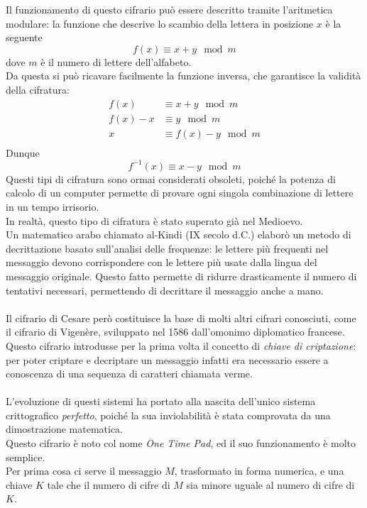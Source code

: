 \documentclass[italian,A4,12pt]{article}
\begin{document}
    Il funzionamento di questo cifrario può essere descritto tramite l'aritmetica modulare: la funzione che descrive lo scambio della lettera in posizione $x$ è la seguente
    $$f(x)\equiv x+y \mod{m}$$
    dove $m$ è il numero di lettere dell'alfabeto.\\
    Da questa si può ricavare facilmente la funzione inversa, che garantisce la validità della cifratura:
    \begin{align*}
      f(x) & \equiv x+y \mod{m}\\
      f(x)-x & \equiv y \mod{m}\\
      x & \equiv f(x)-y \mod{m}\\
    \end{align*}
    Dunque
    $$f^{-1}(x)\equiv x-y \mod{m}$$
    Questi tipi di cifratura sono ormai considerati obsoleti, poiché la potenza di calcolo di un computer permette di provare ogni singola combinazione di lettere in un tempo irrisorio.\\
    In realtà, questo tipo di cifratura è stato superato già nel Medioevo. \\ Un matematico arabo chiamato al-Kindi (IX secolo d.C.) elaborò un metodo di decrittazione basato sull'analisi delle frequenze: le lettere più frequenti nel messaggio devono corrispondere con le lettere più usate dalla lingua del messaggio originale. Questo fatto permette di ridurre drasticamente il numero di tentativi necessari, permettendo di decrittare il messaggio anche a mano.\\\\
    Il cifrario di Cesare però costituisce la base di molti altri cifrari conosciuti, come il cifrario di Vigenère, sviluppato nel 1586 dall'omonimo diplomatico francese.
    Questo cifrario introdusse per la prima volta il concetto di \textit{chiave di criptazione}: per poter criptare e decriptare un messaggio infatti era necessario essere a conoscenza di una sequenza di caratteri chiamata verme.\\\\
    L'evoluzione di questi sistemi ha portato alla nascita dell'unico sistema crittografico \textit{perfetto}, poiché la sua inviolabilità è stata comprovata da una dimostrazione matematica.\\
    Questo cifrario è noto col nome \textit{One Time Pad}, ed il suo funzionamento è molto semplice.\\
    Per prima cosa ci serve il messaggio $M$,  trasformato in forma numerica, e una chiave $K$ tale che il numero di cifre di $M$ sia minore uguale al numero di cifre di $K$.\\
\end{document}

